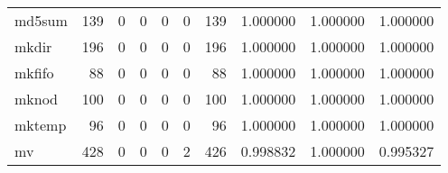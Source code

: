 \begin{longtable}{lrrrrrrrrr}
md5sum    &                                   139 &                                                  0 &                                                  0 &                                                  0 &                                                  0 &                                                139 &                                           1.000000 &                               1.000000 &                             1.000000 \\
mkdir     &                                   196 &                                                  0 &                                                  0 &                                                  0 &                                                  0 &                                                196 &                                           1.000000 &                               1.000000 &                             1.000000 \\
mkfifo    &                                    88 &                                                  0 &                                                  0 &                                                  0 &                                                  0 &                                                 88 &                                           1.000000 &                               1.000000 &                             1.000000 \\
mknod     &                                   100 &                                                  0 &                                                  0 &                                                  0 &                                                  0 &                                                100 &                                           1.000000 &                               1.000000 &                             1.000000 \\
mktemp    &                                    96 &                                                  0 &                                                  0 &                                                  0 &                                                  0 &                                                 96 &                                           1.000000 &                               1.000000 &                             1.000000 \\
mv        &                                   428 &                                                  0 &                                                  0 &                                                  0 &                                                  2 &                                                426 &                                           0.998832 &                               1.000000 &                             0.995327 \\

\end{longtable}
